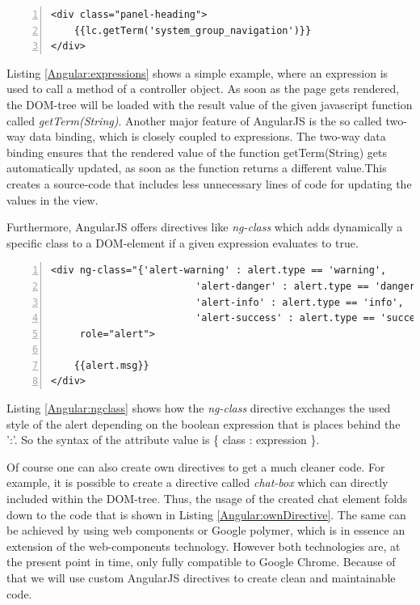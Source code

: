 \begin{lstlisting}[numbers=left,caption={Simple example that shows the use of expressions},label=Angular:expressions,frame=tlbr,breaklines]
<div class="panel-heading"> 
	{{lc.getTerm('system_group_navigation')}} 
</div>
\end{lstlisting}
Listing \ref{Angular:expressions} shows a simple example, where an expression is used to call a method of a controller object. As soon as the page gets rendered, the \ac{DOM}-tree will be loaded with the result value of the given javascript function called \textit{getTerm(String)}. 
Another major feature of AngularJS is the so called two-way data binding, which is closely coupled to expressions. The two-way data binding ensures that the rendered value of the function getTerm(String) gets automatically updated, as soon as the function returns a different value.This creates a source-code that includes less unnecessary lines of code for updating the values in the view. 

Furthermore, AngularJS offers directives like \textit{ng-class} which adds dynamically a specific class to a \ac{DOM}-element if a given expression evaluates to true.

\begin{lstlisting}[numbers=left,caption={Simple example that shows the ng-class directive to change the style respectivly color of an alert depending on its type},label=Angular:ngclass,frame=tlbr,breaklines]
<div ng-class="{'alert-warning' : alert.type == 'warning',
                         'alert-danger' : alert.type == 'danger',
                         'alert-info' : alert.type == 'info',
                         'alert-success' : alert.type == 'success'}"
     role="alert">

	{{alert.msg}}
</div>
\end{lstlisting}
Listing \ref{Angular:ngclass} shows how the \textit{ng-class} directive exchanges the used style of the alert depending on the boolean expression that is places behind the ':'. So the syntax of the attribute value is \{ class : expression \}.

Of course one can also create own directives to get a much cleaner code. For example, it is possible to create a directive called \textit{chat-box} which can directly included within the \ac{DOM}-tree. Thus, the usage of the created chat element folds down to the code that is shown in Listing \ref{Angular:ownDirective}. The same can be achieved by using web components or Google polymer, which is in essence an extension of the web-components technology. However both technologies are, at the present point in time, only fully compatible to Google Chrome. Because of that we will use custom AngularJS directives to create clean and maintainable code.


